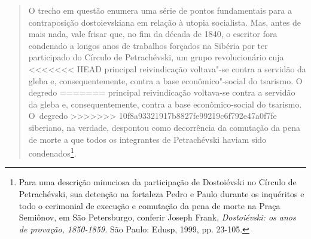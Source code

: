 {\begin{quote}
O trecho em questão enumera uma série de pontos fundamentais para a
contraposição dostoievskiana em relação à utopia socialista. Mas, antes
de mais nada, vale frisar que, no fim da década de 1840, o escritor fora
condenado a longos anos de trabalhos forçados na Sibéria por ter
participado do Círculo de Petrachévski, um grupo revolucionário cuja
<<<<<<< HEAD
principal reivindicação voltava"-se contra a servidão da gleba e,
consequentemente, contra a base econômico"-social do tsarismo. O degredo
=======
principal reivindicação voltava-se contra a servidão da gleba e,
consequentemente, contra a base econômico-social do tsarismo. O~degredo
>>>>>>> 10f8a93321917b8827fe99219c6f792e47a0f7fe
siberiano, na verdade, despontou como decorrência da comutação da pena
de morte a que todos os integrantes de Petrachévski haviam sido
condenados\footnote{Para uma descrição minuciosa da participação de
  Dostoiévski no Círculo de Petrachévski, sua detenção na fortaleza
  Pedro e Paulo durante os inquéritos e todo o cerimonial de execução e
  comutação da pena de morte na Praça Semiônov, em São Petersburgo,
  conferir Joseph Frank, \emph{Dostoiévski: os anos de provação,
  1850-1859.} São Paulo: Edusp, 1999, pp. 23-105.}.


\end{quote}}
